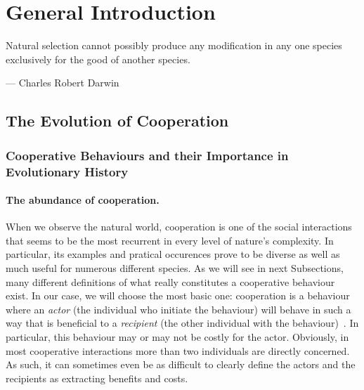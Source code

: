 \chapter{General Introduction}

\epigraph{Natural selection cannot possibly produce any modification in any one species exclusively for the good of another species.}{--- \textup{Charles Robert Darwin}}

\minitoc[n] %


\section{The Evolution of Cooperation}

  \subsection{Cooperative Behaviours and their Importance in Evolutionary History}


    \subsubsection{The abundance of cooperation.} When we observe the natural world, cooperation is one of the social interactions that seems to be the most recurrent in every level of nature's complexity. In particular, its examples and pratical occurences prove to be diverse as well as much useful for numerous different species. As we will see in next Subsections, many different definitions of what really constitutes a cooperative behaviour exist. In our case, we will choose the most basic one: cooperation is a behaviour where an \emph{actor} (the individual who initiate the behaviour) will behave in such a way that is beneficial to a \emph{recipient} (the other individual with the behaviour)~\parencite{West2007a}. In particular, this behaviour may or may not be costly for the actor. Obviously, in most cooperative interactions more than two individuals are directly concerned. As such, it can sometimes even be as difficult to clearly define the actors and the recipients as extracting benefits and costs.

